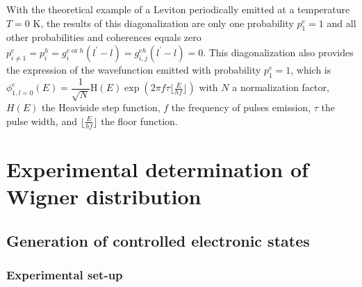 With the theoretical example of a Leviton \cite{levitov1996electro} periodically emitted at a temperature $T = 0$ K, the results of this diagonalization \cite{roussel2017autopsy} are only one probability $p^{e}_1 = 1$ and all other probabilities and coherences equals zero $p^{e}_{i\neq 1} = p^{h}_i = g^{e\;\mathrm{or}\;h}_{i}\left(l^{\prime}-l\right) = g^{eh}_{i,j}\left(l^{\prime}-l\right) = 0$.
This diagonalization also provides the expression of the wavefunction emitted with probability $p^{e}_1 = 1$, which is $\phi^{e}_{1,l=0}(E) = \dfrac{1}{\sqrt{N}}\mathrm{H}(E)\exp\left(2\pi f\tau\lfloor\frac{E}{hf}\rfloor\right)$ with $N$ a normalization factor, $H(E)$ the Heaviside step function, $f$ the frequency of pulses emission, $\tau$ the pulse width, and $\lfloor\frac{E}{hf}\rfloor$ the floor function.



\section{\texorpdfstring{Experimental determination of Wigner distribution}{Experimental determination of Wigner distribution} \label{sec: Experimental determination of Wigner distribution}}


\subsection{Generation of controlled electronic states}

\subsubsection*{Experimental set-up}

